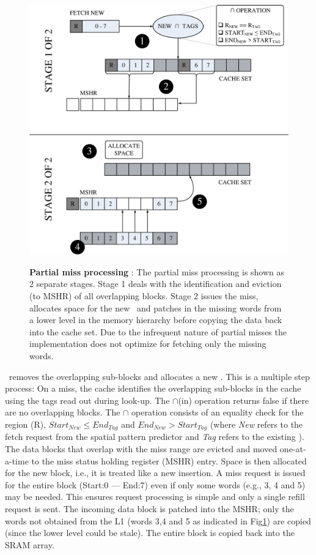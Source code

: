 \begin{figure}[h]
  \includegraphics[width=\textwidth]{files/Figures/06-PartialMiss.pdf}
  \\
  \caption[Partial Miss]{\textbf{Partial miss processing} : The partial miss processing is shown as 2 separate stages. Stage 1 deals with the identification and eviction (to MSHR) of all overlapping blocks. Stage 2 issues the miss, allocates space for the new \AB\ and patches in the missing words from a lower level in the memory hierarchy before copying the data back into the cache set. Due to the infrequent nature of partial misses the implementation does not optimize for fetching only the missing words. }
  \label{fig:partial-miss}
\end{figure}

\clearpage

\AC\ removes the overlapping sub-blocks and allocates a new \AB{}. This is a multiple step process:  On a miss, the cache identifies the overlapping sub-blocks in the cache using the tags read out during look-up. The $\cap$(in) operation returns false if there are no overlapping blocks. The $\cap$ operation consists of an equality check for the region (R), $Start_{New} \leq End_{Tag}$ and $End_{New} > Start_{Tag}$ (where \textit{New} refers to the fetch request from the spatial pattern predictor and \textit{Tag} refers to the existing \AB{}).  The data blocks that overlap with the miss range are evicted and moved one-at-a-time to the miss status holding register (MSHR) entry.  Space is then allocated for the new block, i.e., it is treated like a new insertion. A miss request is issued for the entire block (Start:0 --- End:7) even if only some words (e.g., 3, 4 and 5) may be needed. This ensures request processing is simple and only a single refill request is sent.  The incoming data block is patched into the MSHR; only the words not obtained from the L1 (words 3,4 and 5 as indicated in Fig\ref{fig:partial-miss}) are copied (since the lower level could be stale).  The entire block is copied back into the SRAM array.

